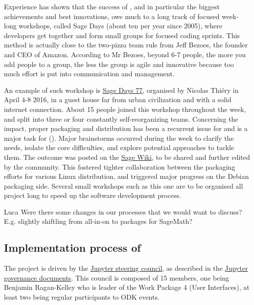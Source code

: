\documentclass{deliverablereport}
\begin{document}
Experience has shown that the success of \Sage, and in particular the
biggest achievements and best innovations, owe much to a long track of
focused week-long workshops, called Sage Days (about ten per year
since 2005), where developers get together and form small groups for
focused coding sprints. This method is actually close to the two-pizza
team rule from Jeff Bezoes, the founder and CEO of Amazon. According
to Mr Bezoes, beyond 6-7 people, the more you add people to a group,
the less the group is agile and innovative because too much effort is
put into communication and management.

An example of such workshop is
\href{https://wiki.sagemath.org/days77/}{Sage Days 77}, organised by
Nicolas Thiéry in April 4-8 2016, in a guest house far from urban
civilization and with a solid internet connection. About 15 people
joined this workshop throughout the week, and split into three or four
constantly self-reorganizing teams. Concerning the impact, proper
packaging and distribution has been a recurrent issue for \Sage and is
a major task for \ODK
(). Major
brainstorms occurred during the week to clarify the needs, isolate the
core difficulties, and explore potential approaches to tackle
them. The outcome was posted on the
\href{https://wiki.sagemath.org/days77/packaging}{Sage Wiki}, to be
shared and further edited by the community. This fostered tighter
collaboration between the packaging efforts for various Linux
distribution, and triggered major progress on the Debian packaging
side. Several small workshops such as this one are to be organised all
project long to speed up the software development process.

\TODO Luca
Were there some changes in our processes that we would want to discuss? E.g. slightly shiftling from all-in-on to packages for SageMath?

\subsection{Implementation process of \Jupyter}

The \Jupyter project is driven by the \href{https://jupyter.org/about.html}{Jupyter steering council}, as described in the \href{https://github.com/jupyter/governance}{Jupyter governance documents}. This council is composed of 15 members, one being Benjamin Ragan-Kelley who is leader of the Work Package 4 (User Interfaces),  at least two being regular participants to ODK events.
\end{document}
